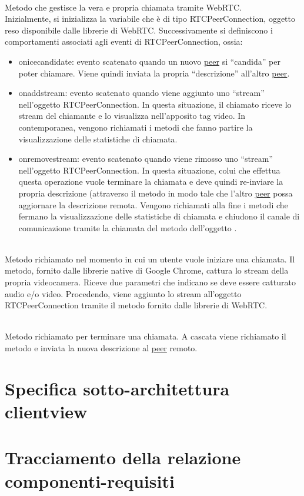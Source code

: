 \begin{description}
\item{}\\
Metodo che gestisce la vera e propria chiamata tramite WebRTC.\\
Inizialmente, si inizializza la variabile  che è di tipo RTCPeerConnection, oggetto reso disponibile dalle librerie di WebRTC. Successivamente si definiscono i comportamenti associati agli eventi di RTCPeerConnection, ossia:
\begin{itemize}
\item onicecandidate: evento scatenato quando un nuovo \underline{peer} si ``candida'' per poter chiamare. Viene quindi inviata la propria ``descrizione'' all'altro \underline{peer}.
\item onaddstream: evento scatenato quando viene aggiunto uno ``stream'' nell'oggetto RTCPeerConnection. In questa situazione, il chiamato riceve lo stream del chiamante e lo visualizza nell'apposito tag video. In contemporanea, vengono richiamati i metodi che fanno partire la visualizzazione delle statistiche di chiamata.
\item onremovestream: evento scatenato quando viene rimosso uno ``stream'' nell'oggetto RTCPeerConnection. In questa situazione, colui che effettua questa operazione vuole terminare la chiamata e deve quindi re-inviare la propria descrizione (attraverso il metodo  in modo tale che l'altro \underline{peer} possa aggiornare la descrizione remota. Vengono richiamati alla fine i metodi che fermano la visualizzazione delle statistiche di chiamata e chiudono il canale di comunicazione tramite la chiamata del metodo  dell'oggetto .
\end{itemize}

\item{}\\
Metodo richiamato nel momento in cui un utente vuole iniziare una chiamata. Il metodo, fornito dalle librerie native di Google Chrome, cattura lo stream della propria videocamera. Riceve due parametri che indicano se deve essere catturato audio e/o video. Procedendo, viene aggiunto lo stream all'oggetto RTCPeerConnection tramite il metodo  fornito dalle librerie di WebRTC.

\item{}\\
Metodo richiamato per terminare una chiamata. A cascata viene richiamato il metodo  e inviata la nuova descrizione al \underline{peer} remoto.
 
 \end{description}

\clearpage

\section{Specifica sotto-architettura clientview}\label{sec:clientviewarchitecture}

\clearpage

\section{Tracciamento della relazione componenti-requisiti}


